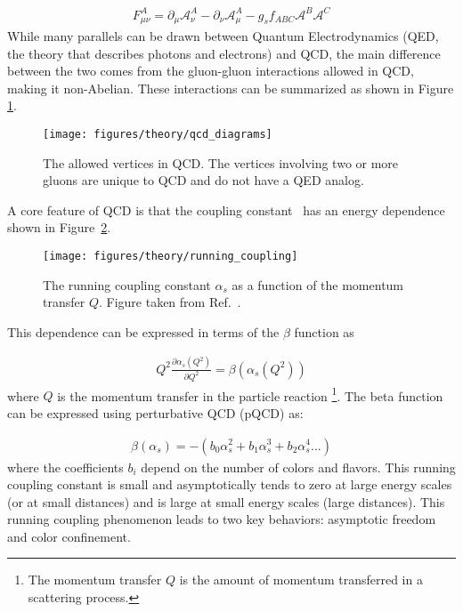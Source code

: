 \begin{align}
F_{\mu\nu}^A = \partial_\mu \mathcal{A}_\nu^A - \partial_\nu \mathcal{A}_\mu^A - g_s f_{ABC} \mathcal{A}^B \mathcal{A}^C
\end{align}
While many parallels can be drawn between Quantum Electrodynamics (QED, the theory that describes photons and electrons) and QCD, the main difference between the two comes from the gluon-gluon interactions allowed in QCD, making it non-Abelian.
These interactions can be summarized as shown in Figure \ref{fig:qcd_diagrams}.

\begin{figure}[htbp]
\begin{center}
\texttt{[image: figures/theory/qcd\_diagrams]}
\caption{The allowed vertices in QCD.
The vertices involving two or more gluons are unique to QCD and do not have a QED analog.}
\label{fig:qcd_diagrams}
\end{center}
\end{figure}

A core feature of QCD is that the coupling constant \alphas\ has an energy dependence shown in Figure~\ref{fig:running_coupling}.

\begin{figure}[htbp]
\begin{center}
\texttt{[image: figures/theory/running\_coupling]}
\caption{The running coupling constant $\alpha_s$ as a function of the momentum transfer $Q$.
Figure taken from Ref.~\cite{Beringer:1481544}.}
\label{fig:running_coupling}
\end{center}
\end{figure}

This dependence can be expressed in terms of the $\beta$ function as

\begin{align}
Q^2 \frac{\partial \alpha_s (Q^2)}{\partial Q^2} = \beta(\alpha_s (Q^2))
\end{align}
where $Q$ is the momentum transfer in the particle reaction
\footnote{The momentum transfer $Q$ is the amount of momentum transferred in a scattering process.}.
The beta function can be expressed using perturbative QCD (pQCD) as:

\begin{align}
\beta( \alpha_s ) = - (b_0 \alpha_s^2 + b_1 \alpha_s^3 + b_2 \alpha_s^4...)
\end{align}
where the coefficients $b_i$ depend on the number of colors and flavors.
This running coupling constant is small and asymptotically tends to zero at large energy scales (or at small distances) and is large at small energy scales (large distances).
This running coupling phenomenon leads to two key behaviors: asymptotic freedom and color confinement.


